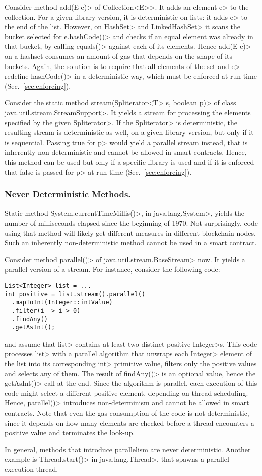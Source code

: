 Consider method \<add(E e)> of \<Collection$\text{<}$E$\text{>}$>.
It adds an element \<e> to the collection. For a given library version,
it is deterministic on lists: it adds \<e> to the end of the list.
However, on \<HashSet> and \<LinkedHashSet> it scans the bucket selected
for \<e.hashCode()> and checks if an equal element was already in that
bucket, by calling \<equals()> against each of its elements. Hence \<add(E e)>
on a hashset consumes an amount of gas that depends on the shape of its buckets.
Again, the solution is to require that all elements of the set and \<e> redefine
\<hashCode()> in a deterministic way, which must be enforced at run time
(Sec.~\ref{sec:enforcing}).

Consider the static method
\<stream(Spliterator$\text{<}$T$\text{>}$ s, boolean p)>
of class \<java.util.stream.StreamSupport>. It
yields a stream for processing the elements specified by
the given \<Spliterator>. If the \<Spliterator> is deterministic,
the resulting stream is deterministic as well,
on a given library version, but only if it is sequential.
Passing true for \<p> would yield a parallel stream instead, that is
inherently non-deterministic and cannot be allowed in smart contracts.
Hence, this method can be used but only if a specific library is used and
if it is enforced that false is passed for \<p> at run time (Sec.~\ref{sec:enforcing}).

\subsubsection*{Never Deterministic Methods.}
Static method \<System.currentTimeMillis()>, in \<java.lang.System>,
yields the number of milliseconds elapsed since the beginning of 1970.
Not surprisingly, code using that method will likely get different measures in different
blockchain nodes.
Such an inherently non-deterministic method cannot be used in a smart contract.

Consider method \<parallel()> of \<java.util.stream.BaseStream> now.
It yields a parallel version of a stream. For instance, consider the following code:
%
\begin{verbatim}
List<Integer> list = ...
int positive = list.stream().parallel()
  .mapToInt(Integer::intValue)
  .filter(i -> i > 0)
  .findAny()
  .getAsInt();
\end{verbatim}
%
and assume that \<list> contains at least two distinct positive \<Integer>s.
This code processes \<list> with a parallel algorithm
that unwraps each \<Integer> element of the list into its corresponding \<int> primitive value,
filters only the positive values and selects any of them.
The result of \<findAny()> is an optional value, hence the
\<getAsInt()> call at the end. Since the algorithm is
parallel, each execution of this code might select a different
positive element, depending on thread scheduling. Hence, \<parallel()>
introduces non-determinism and
cannot be allowed in smart contracts. Note that even the gas consumption
of the code is not deterministic, since it depends on how many elements
are checked before a thread encounters a positive value and terminates
the look-up.

In general, methods that introduce parallelism are never deterministic.
Another example is \<Thread.start()> in \<java.lang.Thread>, that spawns
a parallel execution thread.
